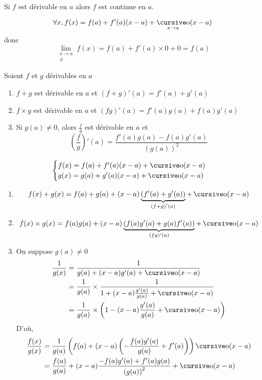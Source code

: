 \begin{prop}
	Si $f$ est dérivable en $a$ alors $f$ est continue en $a$.
\end{prop}

\begin{prv}
	\[
		\forall x, f(x) = f(a) + f'(a)(x-a) + \po_{x\to a}(x-a)
	\] donc \[
		\lim_{\substack{x \to a\\\neq }} f(x)  = f(a) + f'(a) \times 0 + 0 = f(a)
	\] 
\end{prv}

\begin{prop}
	Soient $f$ et $g$ dérivables en $a$ 
	\begin{enumerate}
		\item $f+g$ est dérivable en $a$ et $(f+g)'(a) = f'(a) + g'(a)$ 
		\item $f\times g$ est dérivable en $a$ et $(fg)'(a) = f'(a)g(a) + f(a)g'(a)$
		\item Si $g(a) \neq 0$, alors $\frac{f}{g}$ est dérivable en $a$ et  \[
				\left( \frac{f}{g} \right) '(a) = \frac{f'(a)g(a) - f(a)g'(a)}{\left( g(a) \right) ^2}
		\] 
	\end{enumerate}
\end{prop}

\begin{prv}
	\[
		\begin{cases}
			f(x) = f(a) + f'(a) (x-a) + \po(x-a)\\
			g(x) = g(a) + g'(a) (x-a) + \po(x-a)\\
		\end{cases}
	\] 

	\begin{enumerate}
		\item
			\[
				f(x) + g(x) = f(a) + g(a) + (x-a)\underbrace{\left( f'(a) + g'(a) \right)}_{\left( f+g \right)'(a)} + \po(x-a)
			\] 
		\item \[
				f(x)\times g(x) = f(a)g(a) + (x-a) \underbrace{\left( f(a)g'(a) + g(a)f'(a) \right) }_{(fg)'(a)} + \po(x-a)
			\] 
		\item On suppose $g(a) \neq 0$ \\
			\begin{align*}
				\frac{1}{g(x)} &= \frac{1}{g(a) + (x-a)g'(a) + \po(x-a)}\\
				&= \frac{1}{g(a)} \times \frac{1}{1+(x-a)\frac{g'(a)}{g(a)} + \po(x-a)} \\
				&= \frac{1}{g(a)}\times \left( 1  - (x-a)\frac{g'(a)}{g(a)} + \po(x-a) \right) \\
			\end{align*}
			D'où,
			\begin{align*}
				\frac{f(x)}{g(x)} &= \frac{1}{g(a)}\left( f(a) + (x-a) \left( -\frac{f(a)g'(a)}{g(a)} + f'(a) \right) \right) \po(x-a)\\
				&= \frac{f(a)}{g(a)} + (x-a) \frac{-f(a)g'(a) + f'(a)g(a)}{\left( g(a) \right) ^2} + \po(x-a) \\
			\end{align*}
	\end{enumerate}
\end{prv}

